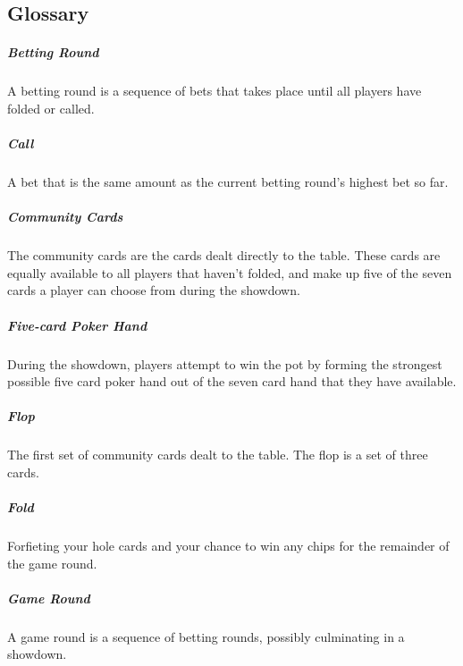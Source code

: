 
\clearpage


\begin{flushleft}

\chapter*{Glossary}

\paragraph*{Betting Round} A betting round is a sequence of bets that takes place until all players have folded or called.

\paragraph*{Call} A bet that is the same amount as the current betting round's highest bet so far.
 
\paragraph*{Community Cards} The community cards are the cards dealt directly to the table. These cards are equally available to all players that haven't folded, and make up five of the seven cards a player can choose from during the showdown.
 
\paragraph*{Five-card Poker Hand} During the showdown, players attempt to win the pot by forming the strongest possible five card poker hand out of the seven card hand that they have available.
 
\paragraph*{Flop} The first set of community cards dealt to the table. The flop is a set of three cards.

\paragraph*{Fold} Forfieting your hole cards and your chance to win any chips for the remainder of the game round.

\paragraph*{Game Round} A game round is a sequence of betting rounds, possibly culminating in a showdown.
 

\end{flushleft}
